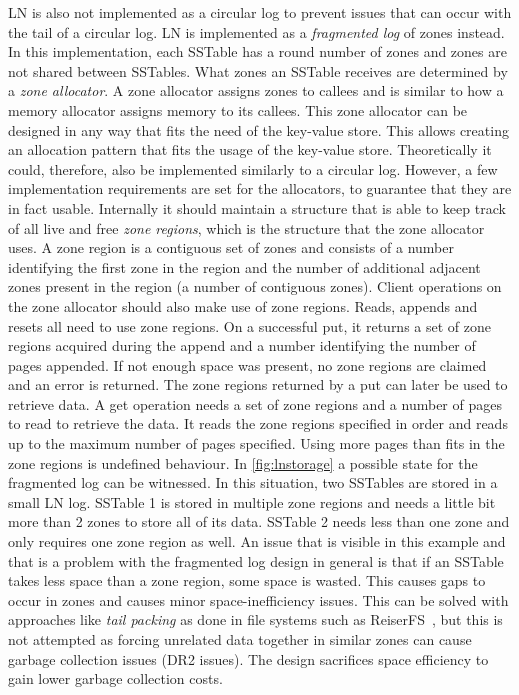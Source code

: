 LN is also not implemented as a circular log to prevent issues that can occur with the tail of a circular log. LN is implemented as a \textit{fragmented log} of zones instead. In this implementation, each SSTable has a round number of zones and zones are not shared between SSTables. What zones an SSTable receives are determined by a \textit{zone allocator}. A zone allocator assigns zones to callees and is similar to how a memory allocator assigns memory to its callees. This zone allocator can be designed in any way that fits the need of the key-value store. This allows creating an allocation pattern that fits the usage of the key-value store. Theoretically it could, therefore, also be implemented similarly to a circular log. However, a few implementation requirements are set for the allocators, to guarantee that they are in fact usable. Internally it should maintain a structure that is able to keep track of all live and free \textit{zone regions}, which is the structure that the zone allocator uses. A zone region is a contiguous set of zones and consists of a number identifying the first zone in the region and the number of additional adjacent zones present in the region (a number of contiguous zones). Client operations on the zone allocator should also make use of zone regions. Reads, appends and resets all need to use zone regions. On a successful put, it returns a set of zone regions acquired during the append and a number identifying the number of pages appended. If not enough space was present, no zone regions are claimed and an error is returned. The zone regions returned by a put can later be used to retrieve data. A get operation needs a set of zone regions and a number of pages to read to retrieve the data. It reads the zone regions specified in order and reads up to the maximum number of pages specified. Using more pages than fits in the zone regions is undefined behaviour. In \autoref{fig:lnstorage} a possible state for the fragmented log can be witnessed. In this situation, two SSTables are stored in a small LN log. SSTable 1 is stored in multiple zone regions and needs a little bit more than 2 zones to store all of its data. SSTable 2 needs less than one zone and only requires one zone region as well. An issue that is visible in this example and that is a problem with the fragmented log design in general is that if an SSTable takes less space than a zone region, some space is wasted. This causes gaps to occur in zones and causes minor space-inefficiency issues. This can be solved with approaches like \textit{tail packing} as done in file systems such as ReiserFS~\cite{galli2001journal}, but this is not attempted as forcing unrelated data together in similar zones can cause garbage collection issues (DR2 issues). The design sacrifices space efficiency to gain lower garbage collection costs.

